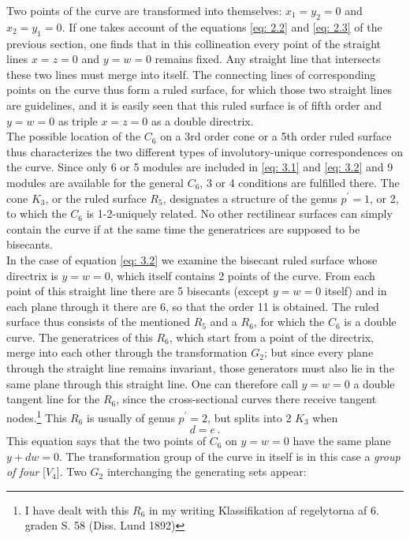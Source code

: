 \documentclass[leqno]{article}
\begin{document}
Two points of the curve are transformed into themselves: $x_1=y_2=0$ and $x_2=y_1=0$. If one takes account of the equations \eqref{eq: 2.2} and \eqref{eq: 2.3} of the previous section, one finds that in this collineation every point of the straight lines $x=z=0$ and $y=w=0$ remains fixed. Any straight line that intersects these two lines must merge into itself. The connecting lines of corresponding points on the curve thus form a ruled surface, for which those two straight lines are guidelines, and it is easily seen that this ruled surface is of fifth order and $y=w=0$ as triple $x=z=0 $ as a double directrix. \\
The possible location of the $C_6$ on a 3rd order cone or a 5th order ruled surface thus characterizes the two different types of involutory-unique correspondences on the curve. Since only 6 or 5 modules are included in \eqref{eq: 3.1} and \eqref{eq: 3.2} and 9 modules are available for the general $C_6$, 3 or 4 conditions are fulfilled there. The cone $K_3$, or the ruled surface $R_5$, designates a structure of the genus $p^\prime=1$, or 2, to which the $C_6$ is 1-2-uniquely related. No other rectilinear surfaces can simply contain the curve if at the same time the generatrices are supposed to be bisecants. \\
In the case of equation \eqref{eq: 3.2} we examine the bisecant ruled surface whose directrix is $y=w=0$, which itself contains 2 points of the curve. From each point of this straight line there are 5 bisecants (except $y=w=0$ itself) and in each plane through it there are 6, so that the order 11 is obtained. The ruled surface thus consists of the mentioned $R_5$ and a $R_6$, for which the $C_6$ is a double curve. The generatrices of this $R_6$, which start from a point of the directrix, merge into each other through the transformation $G_2$; but since every plane through the straight line remains invariant, those generators must also lie in the same plane through this straight line. One can therefore call $y=w=0$ a double tangent line for the $R_6$, since the cross-sectional curves there receive tangent nodes.\footnote{I have dealt with this $R_6$ in my writing \guillemotright Klassifikation af regelytorna af 6. graden \guillemotright S. 58 (Diss. Lund 1892)} This $R_6$ is usually of genus $p^\prime=2$, but splits into 2 $K_3$ when 
\begin{equation}\label{eq: 3.3}
d=e \, . \tag{3}
\end{equation}
This equation says that the two points of $C_6$ on $y=w=0$ have the same plane $y+dw=0$. The transformation group of the curve in itself is in this case a \textit{group of four} [$V_4$]. Two $G_2$ interchanging the generating sets appear:
\end{document}
